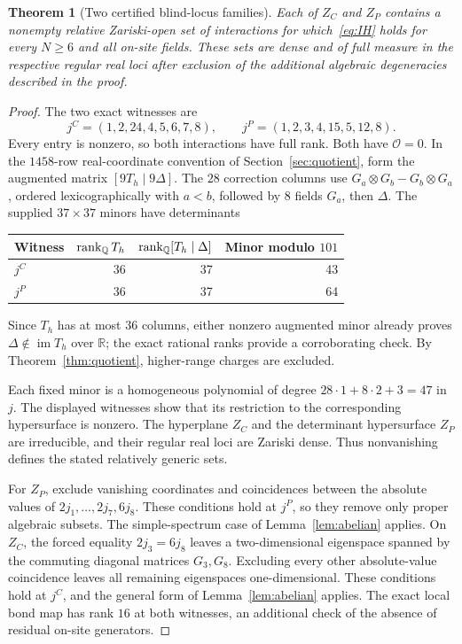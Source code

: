 \documentclass[11pt,a4paper]{article}
\numberwithin{equation}{section}
\newtheorem{theorem}{Theorem}[section]
\theoremstyle{definition}\newtheorem{definition}[theorem]{Definition}
\theoremstyle{remark}\newtheorem{remark}[theorem]{Remark}
\DeclareMathOperator{\im}{im}\DeclareMathOperator{\ad}{ad}
\newcommand{\Q}{\mathbb Q}\newcommand{\C}{\mathbb C}\newcommand{\R}{\mathbb R}
\newcommand{\Ob}{\mathcal O}\newcommand{\tens}{\otimes}
\begin{document}
\begin{theorem}[Two certified blind-locus families]\label{thm:blind}
Each of $Z_C$ and $Z_P$ contains a nonempty relative Zariski-open set of interactions for which~\eqref{eq:IH} holds for every $N\ge6$ and all on-site fields. These sets are dense and of full measure in the respective regular real loci after exclusion of the additional algebraic degeneracies described in the proof.
\end{theorem}
\begin{proof}
The two exact witnesses are
\begin{equation}\label{eq:blindwitness}
 j^C=(1,2,24,4,5,6,7,8),\qquad
 j^P=(1,2,3,4,15,5,12,8).
\end{equation}
Every entry is nonzero, so both interactions have full rank. Both have $\Ob=0$. In the $1458$-row real-coordinate convention of Section~\ref{sec:quotient}, form the augmented matrix $[9T_h\mid9\Delta]$. The $28$ correction columns use $G_a\tens G_b-G_b\tens G_a$, ordered lexicographically with $a<b$, followed by $8$ fields $G_a$, then $\Delta$. The supplied $37\times37$ minors have determinants
\begin{center}
\begin{tabular}{lrrr}
\toprule
Witness & $\rank_{\Q}T_h$ & $\rank_{\Q}[T_h\mid\Delta]$ & Minor modulo $101$\\
\midrule
$j^C$ &36&37&43\\
$j^P$ &36&37&64\\
\bottomrule
\end{tabular}
\end{center}
Since $T_h$ has at most $36$ columns, either nonzero augmented minor already proves $\Delta\notin\im T_h$ over $\R$; the exact rational ranks provide a corroborating check. By Theorem~\ref{thm:quotient}, higher-range charges are excluded.

Each fixed minor is a homogeneous polynomial of degree
$28\cdot1+8\cdot2+3=47$ in $j$. The displayed witnesses show that its restriction to the corresponding hypersurface is nonzero. The hyperplane $Z_C$ and the determinant hypersurface $Z_P$ are irreducible, and their regular real loci are Zariski dense. Thus nonvanishing defines the stated relatively generic sets.

For $Z_P$, exclude vanishing coordinates and coincidences between the absolute values of $2j_1,\ldots,2j_7,6j_8$. These conditions hold at $j^P$, so they remove only proper algebraic subsets. The simple-spectrum case of Lemma~\ref{lem:abelian} applies. On $Z_C$, the forced equality $2j_3=6j_8$ leaves a two-dimensional eigenspace spanned by the commuting diagonal matrices $G_3,G_8$. Excluding every other absolute-value coincidence leaves all remaining eigenspaces one-dimensional. These conditions hold at $j^C$, and the general form of Lemma~\ref{lem:abelian} applies. The exact local bond map has rank $16$ at both witnesses, an additional check of the absence of residual on-site generators.
\end{proof}
\end{document}
